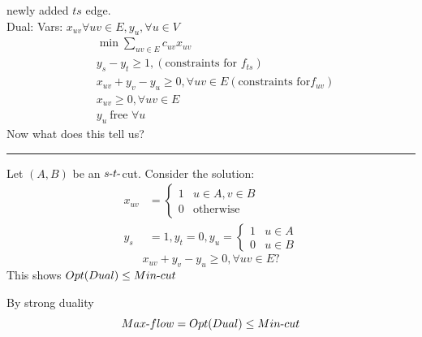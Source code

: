 \documentclass[12 pt]{article}
\begin{document}
          newly added $ts$ edge.
          \\
          Dual: Vars: $x_{uv} \forall uv \in E, y_u, \forall u \in V$
          \begin{align*}
            & \min \sum_{uv \in E}c_{uv}x_{uv}
            \\ & y_s - y_t \geq 1 , (\text{constraints for }f_{ts})
            \\ & x_{uv} + y_v - y_u \geq 0, \forall uv \in E (\text{constraints for}f_{uv})
            \\ & x_{uv} \geq 0, \forall uv\in E
            \\ & y_{u} \ \text{free }\forall u
          \end{align*}
          Now what does this tell us?
          \\ \noindent \rule{\textwidth}{0.5pt}
          Let $(A,B)$ be an $s\hbox{-}t\hbox{-}$cut. Consider the
          solution:
          \begin{align*}
            x_{uv} & =
                     \begin{cases}
                       1 & u\in A, v \in B
                       \\ 0 & \text{otherwise}
                     \end{cases}
                             \\ y_s & = 1, y_t = 0, y_u =
                                      \begin{cases}
                                        1 & u \in A
                                        \\ 0 & u\in B
                                      \end{cases}
          \end{align*}
          $$x_{uv} + y_v-y_u \geq 0, \forall uv \in E?$$
          This shows $Opt(Dual) \leq Min\hbox{-}cut$

          By strong duality
          $$Max\hbox{-}flow=Opt(Dual) \leq Min\hbox{-}cut$$
\end{document}
